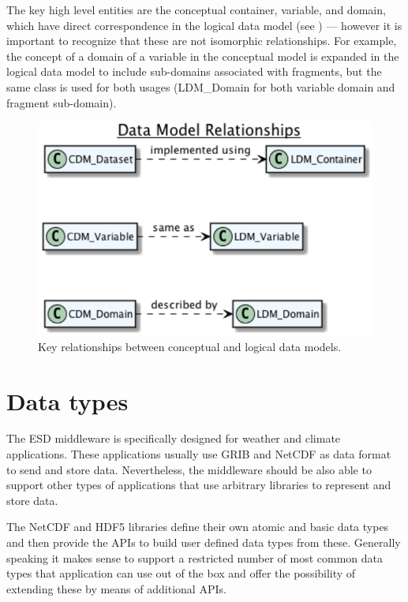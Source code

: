 The key high level entities are the conceptual container, variable, and domain, which have direct correspondence in the logical
data model (see ) --- however it is important to recognize that these are not isomorphic relationships. For example,
the concept of a domain of a variable in the conceptual model is expanded in the logical data model to include sub-domains associated
with fragments, but the same class is used for both usages (LDM\_Domain for both variable domain and fragment sub-domain).

\begin{figure}
	\centering
	\includegraphics[scale=0.6]{figures/cdm_cdm}
	\caption{Key relationships between conceptual and logical data models.}
	\label{fig:dm_map}
\end{figure}

\section{Data types}
\label{sec: viewpoints/logical/data types}

The ESD middleware is specifically designed for weather and climate applications.
These applications usually use GRIB and NetCDF as data format to send and store
data. Nevertheless, the middleware should be also able to support other types of
applications that use arbitrary libraries to represent and store data.

The NetCDF and HDF5 libraries define their own atomic and basic data types and
then provide the APIs to build user defined data types from these. Generally
speaking it makes sense to support a restricted number of most common data types
that application can use out of the box and offer the possibility of extending
these by means of additional APIs.

